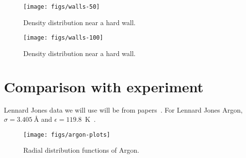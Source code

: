 \documentclass[letterpaper,twocolumn,amsmath,amssymb,prb]{revtex4-1}
\newcommand{\red}[1]{{\color{red} #1}}
\newcommand{\fixme}[1]{\red{[#1]}}
\begin{document}
\begin{figure}
\begin{center}
\texttt{[image: figs/walls-50]}
\end{center}
\caption{Density distribution near a hard wall.}
\label{fig:walls-50}
\end{figure}

\begin{figure}
\begin{center}
\texttt{[image: figs/walls-100]}
\end{center}
\caption{Density distribution near a hard wall.}
\label{fig:walls-100}
\end{figure}

\section{Comparison with experiment}

Lennard Jones data we will use will be from
papers~\cite{mikolaj2004structure, eggert2002quantitative, yarnell1973structure}.
For Lennard Jones Argon, $\sigma = 3.405 ~\textrm{\AA}$ and $\epsilon = 119.8$~K~\cite{verlet1967computer}.
\begin{widetext}[t]
  \begin{figure}
    \begin{center}
      \texttt{[image: figs/argon-plots]}
    \end{center}
    \caption{Radial distribution functions of Argon.}
    \label{fig:argon-plots}
  \end{figure}

\end{widetext}
\end{document}
